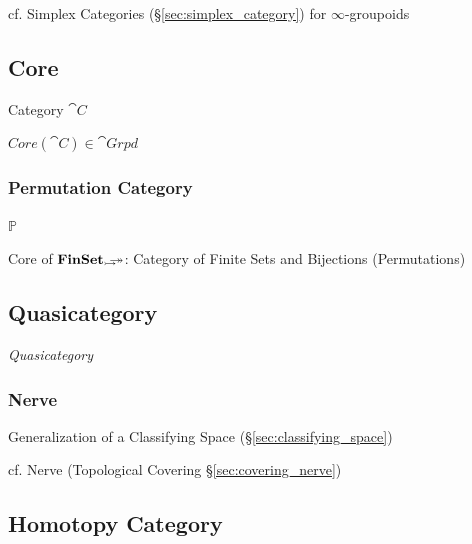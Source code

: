 \fist cf. Simplex Categories (\S\ref{sec:simplex_category}) for
$\infty$-groupoids



\subsection{Core}\label{sec:core}

Category $\cat{C}$

$Core(\cat{C}) \in \cat{Grpd}$



\subsubsection{Permutation Category}\label{sec:permutation_category}

$\mathbb{P}$

Core of $\mathbf{FinSet}_\rightarrowtail\hspace{-8pt}\twoheadrightarrow$: Category of Finite Sets and Bijections
(Permutations)



\subsection{Quasicategory}\label{sec:quasicategory}

\emph{Quasicategory}



\subsubsection{Nerve}\label{sec:nerve}

Generalization of a Classifying Space (\S\ref{sec:classifying_space})

cf. Nerve (Topological Covering \S\ref{sec:covering_nerve})



\subsection{Homotopy Category}\label{sec:homotopy_category}

